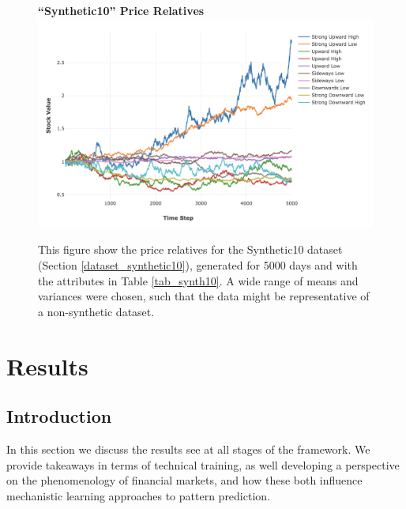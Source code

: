 \documentclass[a4paper,11pt,oneside]{article}
\theoremstyle{plain}
\theoremstyle{definition}
\begin{document}
	
	
	\begin{figure}[H]
		\centering
		\textbf{``Synthetic10'' Price Relatives}
		\includegraphics[scale=0.45]{images/results/prices/synthetic10_prices.png} 
		\caption[Synthetic10 Price Relatives]{This figure show the price relatives for the Synthetic10 dataset (Section \ref{dataset_synthetic10}), generated for 5000 days and with the attributes in Table \ref{tab_synth10}. A wide range of means and variances were chosen, such that the data might be representative of a non-synthetic dataset.}
		\label{figure-synthetic10_prices}
	\end{figure}
	

	
	
	
	
	
	
	
	
	
	\newpage
	\section{Results}\label{Results}
	\subsection{Introduction}\label{results_into}
	
	In this section we discuss the results see at all stages of the framework. We provide takeaways in terms of technical training, as well developing a perspective on the phenomenology of financial markets, and how these both influence mechanistic learning approaches to pattern prediction. \newline
	
\end{document}
